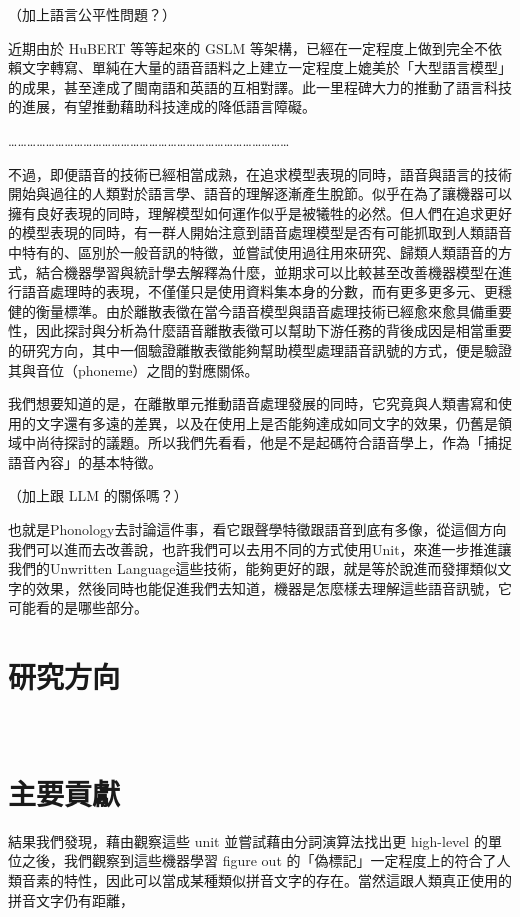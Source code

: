（加上語言公平性問題？）

    近期由於 HuBERT 等等起來的 GSLM 等架構，已經在一定程度上做到完全不依賴文字轉寫、單純在大量的語音語料之上建立一定程度上媲美於「大型語言模型」的成果，甚至達成了閩南語和英語的互相對譯。此一里程碑大力的推動了語言科技的進展，有望推動藉助科技達成的降低語言障礙。

    ………………………………………………………………………………

   不過，即便語音的技術已經相當成熟，在追求模型表現的同時，語音與語言的技術開始與過往的人類對於語言學、語音的理解逐漸產生脫節。似乎在為了讓機器可以擁有良好表現的同時，理解模型如何運作似乎是被犧牲的必然。但人們在追求更好的模型表現的同時，有一群人開始注意到語音處理模型是否有可能抓取到人類語音中特有的、區別於一般音訊的特徵，並嘗試使用過往用來研究、歸類人類語音的方式，結合機器學習與統計學去解釋為什麼，並期求可以比較甚至改善機器模型在進行語音處理時的表現，不僅僅只是使用資料集本身的分數，而有更多更多元、更穩健的衡量標準。由於離散表徵在當今語音模型與語音處理技術已經愈來愈具備重要性，因此探討與分析為什麼語音離散表徵可以幫助下游任務的背後成因是相當重要的研究方向，其中一個驗證離散表徵能夠幫助模型處理語音訊號的方式，便是驗證其與音位（phoneme）之間的對應關係。

    我們想要知道的是，在離散單元推動語音處理發展的同時，它究竟與人類書寫和使用的文字還有多遠的差異，以及在使用上是否能夠達成如同文字的效果，仍舊是領域中尚待探討的議題。所以我們先看看，他是不是起碼符合語音學上，作為「捕捉語音內容」的基本特徵。


（加上跟 LLM 的關係嗎？）


也就是Phonology去討論這件事，看它跟聲學特徵跟語音到底有多像，從這個方向我們可以進而去改善說，也許我們可以去用不同的方式使用Unit，來進一步推進讓我們的Unwritten Language這些技術，能夠更好的跟，就是等於說進而發揮類似文字的效果，然後同時也能促進我們去知道，機器是怎麼樣去理解這些語音訊號，它可能看的是哪些部分。







\section{研究方向}
　　
\section{主要貢獻}  %

結果我們發現，藉由觀察這些 unit 並嘗試藉由分詞演算法找出更 high-level 的單位之後，我們觀察到這些機器學習 figure out 的「偽標記」一定程度上的符合了人類音素的特性，因此可以當成某種類似拼音文字的存在。當然這跟人類真正使用的拼音文字仍有距離，

